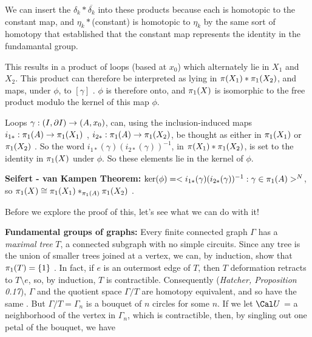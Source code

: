 

We can insert the $\delta_k*\overline{\delta_k}$ 
into these products because each is
homotopic to the constant map, and $\eta_k*$(constant) 
is homotopic to $\eta_k$ by the same sort of homotopy
that established that the constant map represents 
the identity in the fundamantal group.

\msk

This results in a product of loops (based at $x_0$) 
which alternately lie in $X_1$ and $X_2$. This product can
therefore be interpreted as lying in $\pi(X_1)*\pi_1(X_2)$, 
and maps, under $\phi$, to $[\gamma]$ .
$\phi$ is therefore onto, and
$\pi_1(X)$ is isomorphic to the free product modulo the 
kernel of this map $\phi$. 

\msk

Loops $\gamma:(I,\partial I)\rightarrow (A,x_0)$, can, using the inclusion-induced maps  
$i_{1*}:\pi_1(A)\rightarrow \pi_1(X_1)$ , $i_{2*}:\pi_1(A)\rightarrow \pi_1(X_2)$, be thought as either in 
$\pi_1(X_1)$ or $\pi_1(X_2)$ . So the word $i_{1*}(\gamma)(i_{2*}(\gamma))^{-1}$, in 
$\pi(X_1)*\pi_1(X_2)$, is set to the identity in $\pi_1(X)$ under $\phi$. So these 
elements lie in the kernel of $\phi$.

\msk

{\bf Seifert - van Kampen Theorem:} $\ker(\phi) = <i_{1*}(\gamma)(i_{2*}(\gamma))^{-1} : \gamma\in\pi_1(A) >^N$,
so $\pi_1(X)\cong \pi_1(X_1)*_{\pi_1(A)}\pi_1(X_2)$ . 

\bsk

Before we explore the proof of this, let's see what we can do with it!

\msk

{\bf Fundamental groups of graphs:} Every finite 
connected graph $\Gamma$ has a {\it maximal tree} $T$,
a connected subgraph with no simple circuits. Since any tree is the 
union of smaller trees joined at a vertex, we can, by induction, show that 
$\pi_1(T) = \{ 1\}$ . In fact, if $e$ is an outermost edge of $T$, then 
$T$ deformation retracts to $T\setminus e$, so, by induction, $T$ is 
contractible. Consequently ({\it Hatcher, Proposition 0.17}), 
$\Gamma$ and the quotient space $\Gamma/T$
are homotopy equivalent, and so have the same \mpu . 
But $\Gamma/T=\Gamma_n$
is a bouquet of $n$ circles for some $n$. If we let 
${\Cal U}$ = a neighborhood of 
the vertex in $\Gamma_n$, which is contractible, then, 
by singling out one petal of the bouquet,
we have


